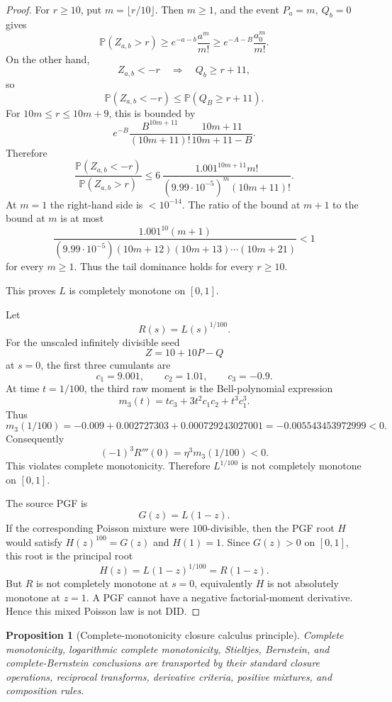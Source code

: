 \documentclass[11pt]{article}
\numberwithin{equation}{section}
\newtheorem{proposition}[theorem]{Proposition}
\theoremstyle{definition}
\theoremstyle{remark}
\newcommand{\1}{\mathbf 1}
\begin{document}
\begin{proof}
For \(r\ge10\), put \(m=\lfloor r/10\rfloor\). Then \(m\ge1\), and the event \(P_a=m,\ Q_b=0\) gives
\[
\mathbb P(Z_{a,b}>r)
\ge e^{-a-b}\frac{a^m}{m!}
\ge e^{-A-B}\frac{a_0^m}{m!}.
\]
On the other hand,
\[
Z_{a,b}<-r\quad\Longrightarrow\quad Q_b\ge r+11,
\]
so
\[
\mathbb P(Z_{a,b}<-r)\le \mathbb P(Q_B\ge r+11).
\]
For \(10m\le r\le10m+9\), this is bounded by
\[
e^{-B}\frac{B^{10m+11}}{(10m+11)!}\frac{10m+11}{10m+11-B}.
\]
Therefore
\[
\frac{\mathbb P(Z_{a,b}<-r)}
{\mathbb P(Z_{a,b}>r)}
\le
6\,\frac{1.001^{10m+11}m!}{(9.99\cdot10^{-5})^m(10m+11)!}.
\]
At \(m=1\) the right-hand side is \(<10^{-14}\). The ratio of the bound at \(m+1\) to the bound at \(m\) is at most
\[
\frac{1.001^{10}(m+1)}
{(9.99\cdot10^{-5})(10m+12)(10m+13)\cdots(10m+21)}
<1
\]
for every \(m\ge1\). Thus the tail dominance holds for every \(r\ge10\).

This proves \(L\) is completely monotone on \([0,1]\).

Let
\[
R(s)=L(s)^{1/100}.
\]
For the unscaled infinitely divisible seed
\[
Z=10+10P-Q
\]
at \(s=0\), the first three cumulants are
\[
c_1=9.001,\qquad c_2=1.01,\qquad c_3=-0.9.
\]
At time \(t=1/100\), the third raw moment is the Bell-polynomial expression
\[
m_3(t)=tc_3+3t^2c_1c_2+t^3c_1^3.
\]
Thus
\[
m_3(1/100)
=-0.009+0.002727303+0.000729243027001
=-0.005543453972999<0.
\]
Consequently
\[
(-1)^3R'''(0)=\eta^3m_3(1/100)<0.
\]
This violates complete monotonicity. Therefore \(L^{1/100}\) is not completely monotone on \([0,1]\).

The source PGF is
\[
G(z)=L(1-z).
\]
If the corresponding Poisson mixture were \(100\)-divisible, then the PGF root \(H\) would satisfy \(H(z)^{100}=G(z)\) and \(H(1)=1\). Since \(G(z)>0\) on \([0,1]\), this root is the principal root
\[
H(z)=L(1-z)^{1/100}=R(1-z).
\]
But \(R\) is not completely monotone at \(s=0\), equivalently \(H\) is not absolutely monotone at \(z=1\). A PGF cannot have a negative factorial-moment derivative. Hence this mixed Poisson law is not DID.
\end{proof}

\begin{proposition}[Complete-monotonicity closure calculus principle]
\label{res:complete-monotonicity-closure-calculus-principle}
Complete monotonicity, logarithmic complete monotonicity, Stieltjes, Bernstein, and complete-Bernstein conclusions are transported by their standard closure operations, reciprocal transforms, derivative criteria, positive mixtures, and composition rules.
\end{proposition}
\end{document}
